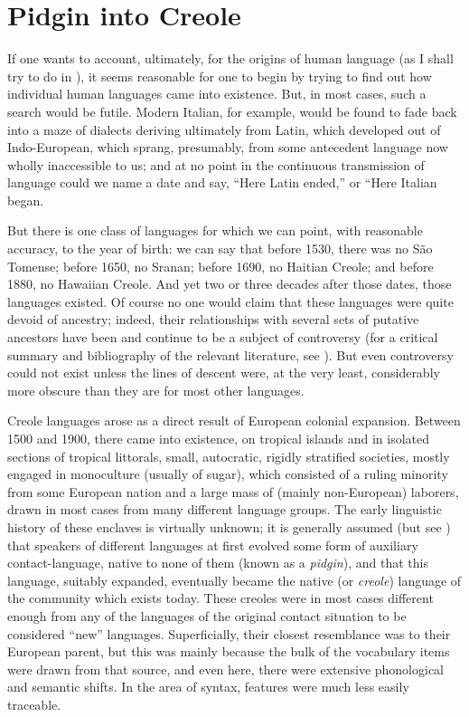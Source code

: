 \chapter{Pidgin into Creole} \label{ch:1}

If one wants to account, ultimately, for the origins of human language (as I shall try to do in ), it seems reasonable for one to begin by trying to find out how individual human languages came into existence. But, in most cases, such a search would be futile. Mod\-ern Italian, for example, would be found to fade back into a maze of dialects deriving ultimately from Latin, which developed out of Indo-European, which sprang, presumably, from some antecedent language now wholly inaccessible to us; and at no point in the continuous transmission of language could we name a date and say, ``Here Latin ended,'' or ``Here Italian began.{\textquotedbl}

But there is one class of languages for which we can point, with reasonable accuracy, to the year of birth: we can say that before 1530, there was no S\~ao Tomense; before 1650, no Sranan; before 1690, no Haitian Creole; and before 1880, no Hawaiian Creole. And yet two or three decades after those dates, those languages existed. Of course no one would claim that these languages were quite devoid of ancestry; indeed, their relationships with several sets of putative ancestors have been and continue to be a subject of controversy (for a critical sum\-mary and bibliography of the relevant literature, see \citealt{Bickerton1976}).
But even controversy could not exist unless the lines of descent were, at the very least, considerably more obscure than they are for most other languages.

Creole languages arose as a direct result of European colonial expansion. Between 1500 and 1900, there came into existence, on tropical islands and in isolated sections of tropical littorals, small, autocratic, rigidly stratified societies, mostly engaged in monoculture (usually of sugar), which consisted of a ruling minority from some European nation and a large mass of (mainly non-European) laborers, drawn in most cases from many different language groups. The early linguistic history of these enclaves is virtually unknown; it is generally assumed (but see \citealt{Alleyne1971,Alleyne1979}) that speakers of different lan\-guages at first evolved some form of auxiliary contact-language, native to none of them (known as a \textit{pidgin}), and that this language, suitably expanded, eventually became the native (or \textit{creole}) language of the community which exists today. These creoles were in most cases different enough from any of the languages of the original contact situation to be considered ``new'' languages. Superficially, their closest resemblance was to their European parent, but this was mainly because the bulk of the vocabulary items were drawn from that source, and even here, there were extensive phonological and semantic shifts. In the area of syntax, features were much less easily traceable.

